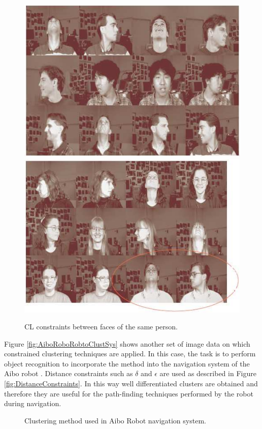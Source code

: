 \begin{figure}[bth]
	\myfloatalign
	{\includegraphics[width=.35\linewidth]{gfx/ConstClust/AnalisisImagenes/CarasDifOr1}} \quad
	{\includegraphics[width=.35\linewidth]{gfx/ConstClust/AnalisisImagenes/CarasDifOr2}}
	\caption[\acs{CL} constraints between faces of the same person.]{\acs{CL} constraints between faces of the same person. \cite{davidson2007survey}}\label{fig:figure10}
\end{figure}

Figure \ref{fig:AiboRoboRobtoClustSys} shows another set of image data on which constrained clustering techniques are applied. In this case, the task is to perform object recognition to incorporate the method into the navigation system of the Aibo robot \cite{davidson2005clustering}. Distance constraints such as $\delta$ and $\epsilon$ are used as described in Figure \ref{fig:DistanceConstraints}. In this way well differentiated clusters are obtained and therefore they are useful for the path-finding techniques performed by the robot during navigation.

\begin{figure}[bth]
	\myfloatalign
	 \quad
	 \quad
	 \quad
	\caption[Clustering method used in Aibo Robot navigation system.]{Clustering method used in Aibo Robot navigation system. \cite{davidson2007survey}\cite{davidson2005clustering}}\label{fig:AiboRobtoClustSys}
\end{figure}

